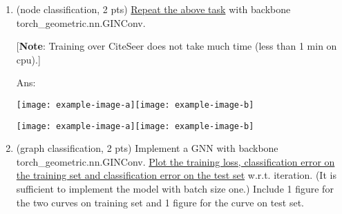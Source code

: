 \documentclass[10pt]{article}
\newcommand{\ans}[1]{{\color{blue}\textsf{Ans}: #1}}
\newcommand{\wrt}{{w.r.t.}\xspace}
\begin{document}
\begin{exercise}
\begin{enumerate}
\begin{itemize}
                    \item \uline{visualize the last layer node embeddings of the initialized model and the trained model}. You may use the following code for visualization:
		            
	\begin{verbatim}
    %matplotlib inline
    import matplotlib.pyplot as plt
    from sklearn.manifold import TSNE
    import torch 

    # emb: (nNodes, hidden_dim) 
    # node_type: (nNodes,). Entries are torch.int64 ranged from 0 to num_class - 1
    def visualize(emb: torch.tensor, node_type: torch.tensor):
        z = TSNE(n_components=2).fit_transform(emb.detach().cpu().numpy())
        plt.figure(figsize=(10,10))
        plt.scatter(z[:, 0], z[:, 1], s=70, c=node_type, cmap="Set2")
        plt.show()
    \end{verbatim}

		      \ans{%
		        \begin{center}
		        \texttt{[image: example-image-a]}\texttt{[image: example-image-b]}
		         
                \texttt{[image: example-image-a]}\texttt{[image: example-image-b]}
                \end{center}
		        }
            \end{itemize}
		            
		  \item (node classification, 2 pts) \uline{Repeat the above task} with backbone \textsf{torch\_geometric.nn.GINConv}. 
		  
		  [\textbf{Note}: Training over CiteSeer does not take much time (less than 1 min on cpu).]

		  \ans{%
          \begin{center}
          \texttt{[image: example-image-a]}\texttt{[image: example-image-b]}
          
          \texttt{[image: example-image-a]}\texttt{[image: example-image-b]}
          \end{center}
          }
		 
		 \item (graph classification, 2 pts) 
		 Implement a GNN with backbone \textsf{torch\_geometric.nn.GINConv}. \uline{Plot the training loss, classification error on the training set and classification error on the test set} \wrt iteration. (It is sufficient to implement the model with batch size one.) Include 1 figure for the two curves on training set and 1 figure for the curve on test set.
		 

\end{enumerate}
\end{exercise}
\end{document}

